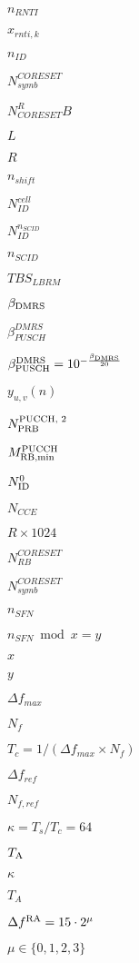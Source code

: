 \documentclass{article}
\begin{document}
$n_{RNTI}$
\pagebreak

$x_{rnti, k}$
\pagebreak

$n_{ID}$
\pagebreak

$N^{CORESET}_{symb}$
\pagebreak

$N_{CORESET}^RB$
\pagebreak

$L$
\pagebreak

$R$
\pagebreak

$n_{shift}$
\pagebreak

$N^{cell}_{ID}$
\pagebreak

$N^{n_{SCID}}_{ID}$
\pagebreak

$n_{SCID}$
\pagebreak

$TBS_{LBRM}$
\pagebreak

$\beta _\textup{DMRS}$
\pagebreak

$\beta _{PUSCH}
^{DMRS}$
\pagebreak

$\beta _\textup{PUSCH} ^\textup{DMRS}=10^{-\frac {\beta
_\textup{DMRS}}{20} }$
\pagebreak

$y_{u,v}(n)$
\pagebreak

$N^\textup{PUCCH, 2}_\textup{PRB}$
\pagebreak

$M^\textup{PUCCH}_\textup{RB,min}$
\pagebreak

$N_{\textup{ID}}^0$
\pagebreak

$N_{CCE}$
\pagebreak

$R\times 1024$
\pagebreak

$N_{RB}^{CORESET}$
\pagebreak

$N_{symb}^{CORESET}$
\pagebreak

$n_{SFN}$
\pagebreak

$n_{SFN} \bmod x = y$
\pagebreak

$x$
\pagebreak

$y$
\pagebreak

$\Delta f_{max}$
\pagebreak

$N_f$
\pagebreak

$T_c = 1/(\Delta f_{max} \times N_f)$
\pagebreak

$\Delta f_{ref}$
\pagebreak

$N_{f,ref}$
\pagebreak

$\kappa=T_s/T_c=64$
\pagebreak

$T_{\textup{A}}$
\pagebreak

$\kappa$
\pagebreak

$T_A$
\pagebreak

$\Delta f ^\textup{RA} = 15 \cdot 2^\mu$
\pagebreak

$\mu
\in \{0, 1, 2, 3\}$
\pagebreak
\end{document}
